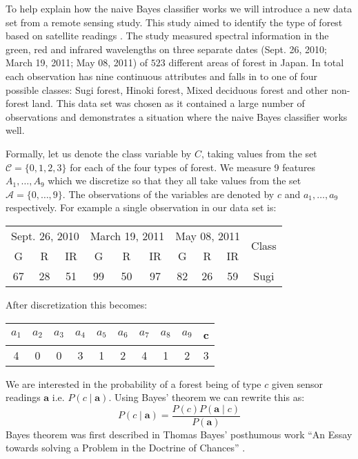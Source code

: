 To help explain how the naive Bayes classifier works we will introduce a new data set from a remote sensing study.
This study aimed to identify the type of forest based on satellite readings \cite{Forrest}.
The study measured spectral information in the green, red and infrared wavelengths on three separate dates (Sept. 26, 2010; March 19, 2011; May 08, 2011) of $523$ different areas of forest in Japan.
In total each observation has nine continuous attributes and falls in to one of four possible classes: Sugi forest, Hinoki forest, Mixed deciduous forest and other non-forest land.
This data set was chosen as it contained a large number of observations and demonstrates a situation where the naive Bayes classifier works well.

Formally, let us denote the class variable by $C$, taking values from the set $\mathcal{C} = \{0,1,2,3\}$ for each of the four types of forest.
We measure 9 features $A_1,\dots,A_9$ which we discretize so that they all take values from the set $\mathcal{A} = \{0,\dots,9\}$.
The observations of the variables are denoted by $c$ and $a_1,\dots,a_9$ respectively.
For example a single observation in our data set is:
\begin{center}
\begin{tabular}{c c c c c c c c c c}
\hline
\multicolumn{3}{c}{Sept. 26, 2010} & \multicolumn{3}{c}{March 19, 2011} & \multicolumn{3}{c}{May 08, 2011} & \multirow{2}{*}{Class} \\
G & R & IR & G & R & IR & G & R & IR \\
\hline
67&28&51&99&50&97&82&26&59 & Sugi \\
\hline
\end{tabular}
\end{center}
After discretization this becomes:
\begin{center}
\begin{tabular}{c c c c c c c c c c}
\hline
$a_1$ & $a_2$ & $a_3$ & $a_4$ & $a_5$ & $a_6$ & $a_7$ & $a_8$ & $a_9$ & c \\
\hline
4     & 0     & 0     & 3     & 1     & 2     & 4     & 1     & 2     & 3\\
\hline
\end{tabular}
\end{center}

We are interested in the probability of a forest being of type $c$ given sensor readings $\mathbf{a}$ i.e. $P(c \mid \mathbf{a})$.
Using Bayes' theorem we can rewrite this as:
\begin{equation} \label{bayes}
	P(c \mid \mathbf{a}) = \frac{P(c)P(\mathbf{a} \mid c)}{P(\mathbf{a})}
\end{equation}
Bayes theorem was first described in Thomas Bayes' posthumous work ``An Essay towards solving a Problem in the Doctrine of Chances'' \cite{Bayes63}.

